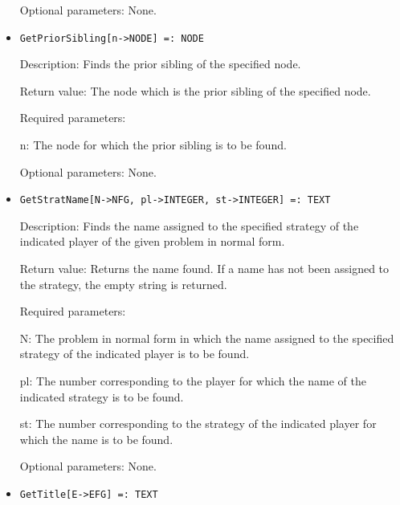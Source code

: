 \begin{itemize}
\item
[Optional parameters:] None.
\ed

\item
\protect \large \begin{verbatim}
GetPriorSibling[n->NODE] =: NODE
\end{verbatim}\normalsize

\bd
\item
[Description:] Finds the prior sibling of the specified node.
\item
[Return value:] The node which is the prior sibling of the specified
node.
\item
[Required parameters:]\hfil\null

\bd
\item
[n:] The node for which the prior sibling is to be found.
\ed

\item
[Optional parameters:] None.
\ed

\item
\protect \large \begin{verbatim}
GetStratName[N->NFG, pl->INTEGER, st->INTEGER] =: TEXT
\end{verbatim}\normalsize

\bd
\item
[Description:] Finds the name assigned to the specified strategy of
the indicated player of the given problem in normal form.
\item
[Return value:] Returns the name found.  If a name has not been
assigned to the strategy, the empty string is returned.
\item
[Required parameters:]\hfil\null

\bd
\item
[N:] The problem in normal form in which the name assigned to the
specified strategy of the indicated player is to be found.
\item
[pl:] The number corresponding to the player for which the name of the
indicated strategy is to be found.
\item
[st:] The number corresponding to the strategy of the indicated player
for which the name is to be found.
\ed

\item
[Optional parameters:] None.
\ed

\item
\protect \large \begin{verbatim}
GetTitle[E->EFG] =: TEXT
\end{verbatim}\normalsize


\end{itemize}
